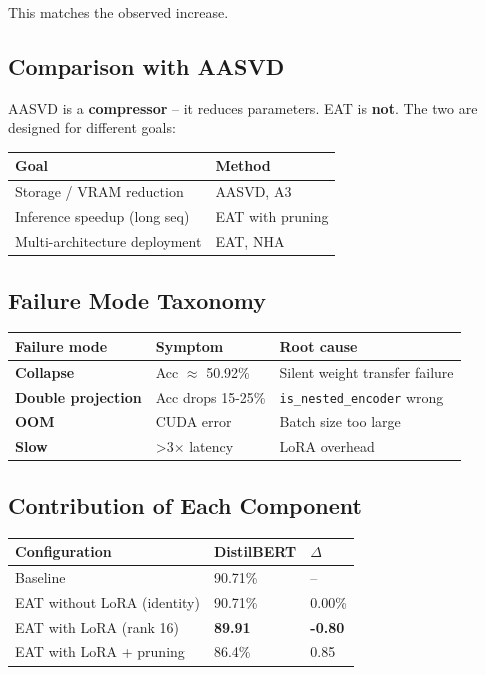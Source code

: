 This matches the observed increase.

\subsection{Comparison with AASVD}

AASVD is a \textbf{compressor} -- it reduces parameters. EAT is \textbf{not}. The two 
are designed for different goals:

\begin{table}[H]
\centering
\small
\begin{tabular}{ll}
\toprule
\textbf{Goal} & \textbf{Method} \\
\midrule
Storage / VRAM reduction & AASVD, A3 \\
Inference speedup (long seq) & EAT with pruning \\
Multi-architecture deployment & EAT, NHA \\
\bottomrule
\end{tabular}
\end{table}

\subsection{Failure Mode Taxonomy}

\begin{table}[H]
\centering
\small
\begin{tabular}{lll}
\toprule
\textbf{Failure mode} & \textbf{Symptom} & \textbf{Root cause} \\
\midrule
\textbf{Collapse} & Acc $\approx$ 50.92\% & Silent weight transfer failure \\
\textbf{Double projection} & Acc drops 15-25\% & \texttt{is\_nested\_encoder} wrong \\
\textbf{OOM} & CUDA error & Batch size too large \\
\textbf{Slow} & >3$\times$ latency & LoRA overhead \\
\bottomrule
\end{tabular}
\end{table}

\subsection{Contribution of Each Component}

\begin{table}[H]
\centering
\small
\begin{tabular}{lll}
\toprule
\textbf{Configuration} & \textbf{DistilBERT} & \textbf{$\Delta$} \\
\midrule
Baseline & 90.71\% & -- \\
EAT without LoRA (identity) & 90.71\% & 0.00\% \\
EAT with LoRA (rank 16) & \textbf{89.91} & \textbf{-0.80} \\
EAT with LoRA + pruning & 86.4\% & 0.85 \\
\bottomrule
\end{tabular}
\end{table}

